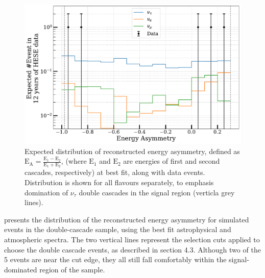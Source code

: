 \begin{figure}
    
    \includegraphics{./figures/results/Energy_ratio.pdf}
    
    \caption[Data/MC distribution of Energy asymmetry in double cascade sample]{Expected distribution of reconstructed energy asymmetry, defined as $\mathrm{E}_{\mathrm{A}}=\frac{\mathrm{E}_1-\mathrm{E}_2}{\mathrm{E}_1+\mathrm{E}_2}$, (where $\mathrm{E}_1$ and $\mathrm{E}_2$ are energies of first and second cascades, respectively) at best fit, along with data events. Distribution is shown for all flavours separately, to emphasis domination of $\nu_{\tau}$ double cascades in the signal region (verticla grey lines).}
\end{figure}

 presents the distribution of the reconstructed energy asymmetry for simulated events in the double-cascade sample, using the best fit astrophysical and atmospheric spectra. The two vertical lines represent the selection cuts applied to choose the double cascade events, as described in section 4.3. Although two of the 5 events are near the cut edge, they all still fall comfortably within the signal-dominated region of the sample.

